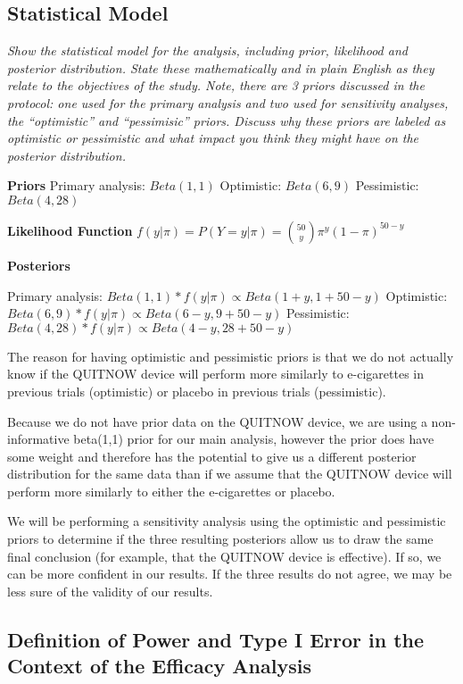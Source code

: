 \documentclass[
]{article}
\begin{document}
\hypertarget{statistical-model-1}{%
\subsection{Statistical Model}\label{statistical-model-1}}

\emph{Show the statistical model for the analysis, including prior,
likelihood and posterior distribution. State these mathematically and in
plain English as they relate to the objectives of the study. Note, there
are 3 priors discussed in the protocol: one used for the primary
analysis and two used for sensitivity analyses, the ``optimistic'' and
``pessimisic'' priors. Discuss why these priors are labeled as
optimistic or pessimistic and what impact you think they might have on
the posterior distribution.}

\textbf{Priors} Primary analysis: \(Beta(1,1)\) Optimistic:
\(Beta(6,9)\) Pessimistic: \(Beta(4,28)\)

\textbf{Likelihood Function}
\(f(y|\pi) = P(Y=y|\pi)=\binom{50}{y}\pi^y(1-\pi)^{50-y}\)

\textbf{Posteriors}

Primary analysis: \(Beta(1,1)*f(y|\pi)\propto Beta(1+y, 1+50-y)\)
Optimistic: \(Beta(6,9)*f(y|\pi)\propto Beta(6-y, 9+50-y)\) Pessimistic:
\(Beta(4,28)*f(y|\pi)\propto Beta(4-y, 28+50-y)\)

The reason for having optimistic and pessimistic priors is that we do
not actually know if the QUITNOW device will perform more similarly to
e-cigarettes in previous trials (optimistic) or placebo in previous
trials (pessimistic).

Because we do not have prior data on the QUITNOW device, we are using a
non-informative beta(1,1) prior for our main analysis, however the prior
does have some weight and therefore has the potential to give us a
different posterior distribution for the same data than if we assume
that the QUITNOW device will perform more similarly to either the
e-cigarettes or placebo.

We will be performing a sensitivity analysis using the optimistic and
pessimistic priors to determine if the three resulting posteriors allow
us to draw the same final conclusion (for example, that the QUITNOW
device is effective). If so, we can be more confident in our results. If
the three results do not agree, we may be less sure of the validity of
our results.

\hypertarget{definition-of-power-and-type-i-error-in-the-context-of-the-efficacy-analysis}{%
\subsection{Definition of Power and Type I Error in the Context of the
Efficacy
Analysis}\label{definition-of-power-and-type-i-error-in-the-context-of-the-efficacy-analysis}}
\end{document}
